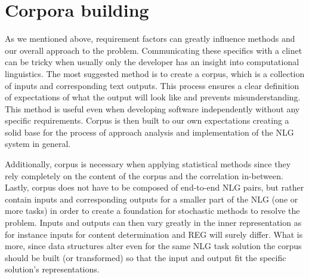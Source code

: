 \section{Corpora building}
As we mentioned above, requirement factors can greatly influence methods and our overall approach to the problem. Communicating these specifics with a clinet can be tricky when usually only the developer has an insight into computational linguistics. The most suggested method is to create a corpus, which is a collection of inputs and corresponding text outputs. This process ensures a clear definition of expectations of what the output will look like and prevents misunderstanding. This method is useful even when developing software independently without any specific requirements. Corpus is then built to our own expectations creating a solid base for the process of approach analysis and implementation of the NLG system in general. 

Additionally, corpus is necessary when applying statistical methods since they rely completely on the content of the corpus and the correlation in-between. Lastly, corpus does not have to be composed of end-to-end NLG pairs, but rather contain inputs and corresponding outputs for a smaller part of the NLG (one or more tasks) in order to create a foundation for stochastic methods to resolve the problem. Inputs and outputs can then vary greatly in the inner representation as for instance inputs for content determination and REG will surely differ. What is more, since data structures  alter even for the same NLG task solution the corpus should be built (or transformed) so that the input and output fit the specific solution's representations.

